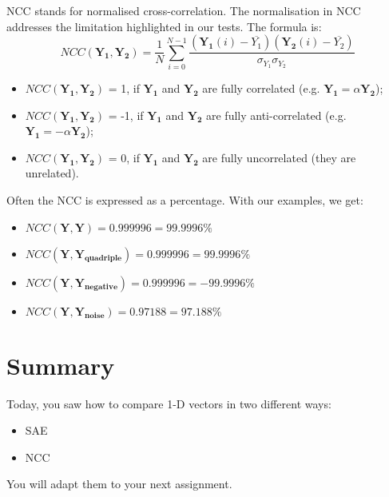 \documentclass[english,a4paper,12pt,oneside]{article}
\begin{document}
NCC stands for normalised cross-correlation. 
The normalisation in NCC addresses the limitation highlighted in our tests. 
The formula is:
\begin{equation}
NCC(\mathbf{Y_1}, \mathbf{Y_2}) = \frac{1}{N}\sum^{N-1}_{i=0} \frac{(\mathbf{Y_1}(i)-\overline{Y_1})(\mathbf{Y_2}(i)-\overline{Y_2})}{\sigma_{Y_1}\sigma_{Y_2}}
\end{equation}
\begin{itemize}
\item $NCC(\mathbf{Y_1}, \mathbf{Y_2})$ = 1, if $\mathbf{Y_1}$ and $\mathbf{Y_2}$ are fully correlated (e.g. $\mathbf{Y_1} = \alpha \mathbf{Y_2}$);
\item $NCC(\mathbf{Y_1}, \mathbf{Y_2})$ = -1, if $\mathbf{Y_1}$ and $\mathbf{Y_2}$ are fully anti-correlated (e.g. $\mathbf{Y_1} = -\alpha \mathbf{Y_2}$);
\item $NCC(\mathbf{Y_1}, \mathbf{Y_2})$ = 0, if $\mathbf{Y_1}$ and $\mathbf{Y_2}$ are fully uncorrelated (they are unrelated).
\end{itemize}
Often the NCC is expressed as a percentage. 
With our examples, we get:
\begin{itemize}
\item $NCC(\mathbf{Y}, \mathbf{Y}) = 0.999996 =	99.9996\%$
\item $NCC(\mathbf{Y}, \mathbf{Y_{quadriple}}) = 0.999996 =	99.9996\%$
\item $NCC(\mathbf{Y}, \mathbf{Y_{negative}}) = 0.999996 =	-99.9996\%$
\item $NCC(\mathbf{Y}, \mathbf{Y_{noise}}) =  0.97188 =	97.188\%$
\end{itemize}


\section*{Summary}

Today, you saw how to compare 1-D vectors in two different ways:
\begin{itemize}
\item SAE
\item NCC
\end{itemize}
You will adapt them to your next assignment.

\end{document}
